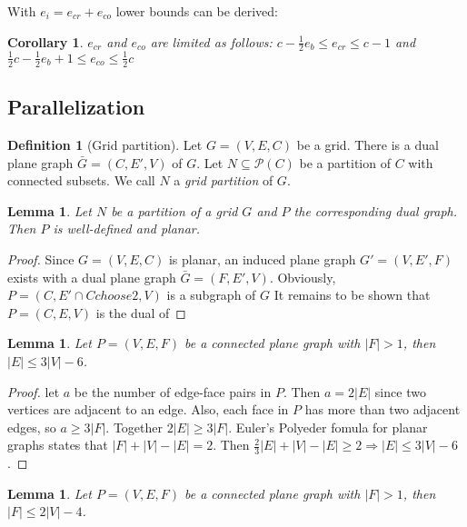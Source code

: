 \documentclass{IOS-Book-Article}
\theoremstyle{plain}
\newtheorem{lemma}[theorem]{Lemma}
\newtheorem{corollary}[theorem]{Corollary}
\theoremstyle{definition}
\newtheorem{definition}{Definition}[section]
\begin{document}
With $e_i = e_{cr} + e_{co}$ lower bounds can be derived:

\begin{corollary}
	$ e_{cr}$ and $ e_{co}$ are limited as follows: $c - \frac{1}{2} e_b \leq e_{cr} \leq c - 1$ and $\frac{1}{2} c - \frac{1}{2} e_b + 1 \leq e_{co} \leq \frac{1}{2} c$ 
\end{corollary}


\subsection{Parallelization}

\begin{definition}[Grid partition]
	Let $G = (V, E, C)$ be a grid. There is a dual plane graph $\bar G = (C, E', V)$ of $G$. Let $N \subseteq \mathcal P(C)$ be a partition of $C$ with connected subsets. We call $N$ a \emph{grid partition} of $G$.
\end{definition}

\begin{lemma}
	\label{lem:edge_part}
	Let $N$ be a partition of a grid $G$ and $P$ the corresponding dual graph. Then $P$ is well-defined and planar.
\end{lemma}

\begin{proof} Since $G = (V, E, C)$ is planar, an induced plane graph $G' = (V, E', F)$ exists with a dual plane graph $\bar G = (F, E', V)$. Obviously, $P = (C, E' \cap {C choose 2}, V)$ is a subgraph of $G$ It remains to be shown that $P = (C, E, V)$ is the dual of 
\end{proof}

\begin{lemma}
	\label{lem:edge_limit}
	Let $P = (V, E, F)$ be a connected plane graph with $|F| > 1$, then $|E| \leq 3 |V| - 6$.
\end{lemma}

\begin{proof}
	let $a$ be the number of edge-face pairs in $P$. Then $a = 2 |E|$ since two vertices are adjacent to an edge. Also, each face in $P$ has more than two adjacent edges, so $a \geq 3 |F|$. Together $2 |E| \geq 3 |F|$. Euler's Polyeder fomula for planar graphs states that $|F| + |V| - |E| = 2$. Then $\frac{2}{3} |E| + |V| - |E| \geq 2 \Rightarrow |E| \leq 3 |V| - 6$.
\end{proof}

\begin{lemma}
	\label{lem:face_limit}
	Let $P = (V, E, F)$ be a connected plane graph with $|F| > 1$, then $|F| \leq 2 |V| - 4$.
\end{lemma}
\end{document}
